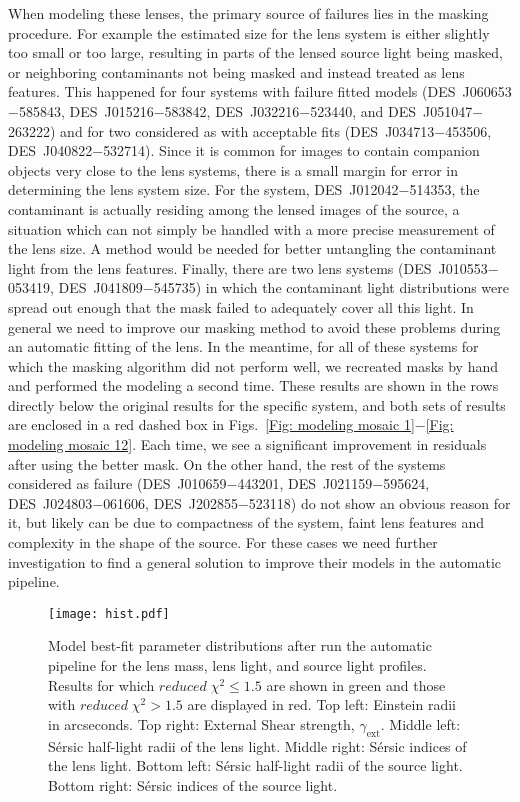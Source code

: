 \documentclass[tradiabstract,twocolumn]{aa}
\begin{document}
When modeling these lenses, the primary source of failures lies in the masking procedure. For example the estimated size for the lens system is either slightly too small or too large, resulting in parts of the lensed source light being masked, or neighboring contaminants not being masked and instead treated as lens features. This happened for four systems with failure fitted models (DES~J060653$-$585843, DES~J015216$-$583842, DES~J032216$-$523440, and DES~J051047$-$263222) and for two considered as with acceptable fits (DES~J034713$-$453506, DES~J040822$-$532714). Since it is common for images to contain companion objects very close to the lens systems, there is a small margin for error in determining the lens system size. For the system, DES~J012042$-$514353, the contaminant is actually residing among the lensed images of the source, a situation which can not simply be handled with a more precise measurement of the lens size. A method would be needed for better untangling the contaminant light from the lens features. Finally, there are two lens systems (DES~J010553$-$053419, DES~J041809$-$545735) in which the contaminant light distributions were spread out enough that the mask failed to adequately cover all this light. In general we need to improve our masking method to avoid these problems during an automatic fitting of the lens. In the meantime, for all of these systems for which the masking algorithm did not perform well, we recreated masks by hand and performed the modeling a second time. These results are shown in the rows directly below the original results for the specific system, and both sets of results are enclosed in a red dashed box in Figs.~\ref{Fig: modeling mosaic 1}$-$\ref{Fig: modeling mosaic 12}. Each time, we see a significant improvement in residuals after using the better mask. On the other hand, the rest of the systems considered as failure (DES~J010659$-$443201, DES~J021159$-$595624, DES~J024803$-$061606, DES~J202855$-$523118) do not show an obvious reason for it, but likely can be due to compactness of the system, faint lens features and complexity in the shape of the source. For these cases we need further investigation to find a general solution to improve their models in the automatic pipeline.  


\begin{figure}
\centering
\texttt{[image: hist.pdf]}
\caption{Model best-fit parameter distributions after run the automatic pipeline for the lens mass, lens light, and source light profiles. Results for which $reduced \; \chi^2 \leq 1.5$ are shown in green and those with $reduced \; \chi^2 > 1.5$ are displayed in red. Top left: Einstein radii in arcseconds. Top right: External Shear strength, $\gamma_{\text{ext}}$. Middle left: S\'ersic half-light radii of the lens light. Middle right: S\'ersic indices of the lens light. Bottom left: S\'ersic half-light radii of the source light. Bottom right: S\'ersic indices of the source light. }
\label{Fig: param histograms}
\end{figure}
\end{document}
